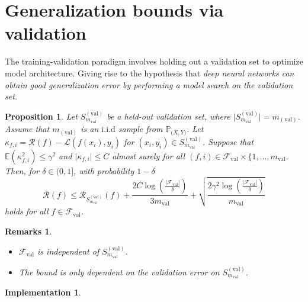\documentclass[wide]{adonis}
\newtheorem{proposition}[theorem]{Proposition}
\newtheorem{remarks}[theorem]{Remarks}
\newtheorem{implementation}[theorem]{Implementation}
\begin{document}
\section{Generalization bounds via validation}
The training-validation paradigm involves holding out a validation set to optimize model architecture. Giving rise to the hypothesis that \textit{deep neural networks can obtain good generalization error by performing a model search on the validation set.}
\begin{proposition}
    Let $S_{m_{\mathrm{val}}}^{\mathrm{(val)}}$ be a held-out validation set, where $\vert S_{m_{\mathrm{val}}}^{\mathrm{(val)}}\vert=m_{\mathrm{(val)}}$. Assume that $m_{\mathrm{(val)}}$ is an $\mathrm{i.i.d}$ sample from $\mathbb{P}_{\mathcal(X,Y)}$. Let $\kappa_{f,i}=\mathcal{R}(f)-\mathcal{L}(f(x_i),y_i)$ for $(x_i,y_i)\in S_{m_{\mathrm{val}}}^{\mathrm{(val)}}$. Suppose that $\mathbb{E}(\kappa_{f,i}^2)\leq\gamma^2$ and $\vert\kappa_{f,i}\vert\leq C$ almost surely for all $(f,i)\in\mathcal{F}_{\mathrm{val}}\times\{1,\dots,m_{\mathrm{val}}$. Then, for $\delta\in(0,1]$, with probability $1-\delta$
    $$\mathcal{R}(f)\leq\mathcal{R}_{S_{m_{\mathrm{val}}}^{\mathrm{(val)}}}(f)+\frac{2C\log\left(\frac{\vert\mathcal{F}_{\mathrm{val}}\vert}{\delta}\right)}{3m_{\mathrm{val}}}+\sqrt{\frac{2\gamma^2\log\left(\frac{\vert\mathcal{F}_{\mathrm{val}}\vert}{\delta}\right)}{m_{\mathrm{val}}}}$$
    holds for all $f\in\mathcal{F}_{\mathrm{val}}$.
\end{proposition}
\begin{remarks}
\
\begin{itemize}
    \item $\mathcal{F}_{\mathrm{val}}$ is independent of $S_{m_{\mathrm{val}}}^{\mathrm{(val)}}$.
    \item The bound is only dependent on the validation error on $S_{m_{\mathrm{val}}}^{\mathrm{(val)}}$.
\end{itemize}
\end{remarks}
\begin{implementation}
    
\end{implementation}
\end{document}
